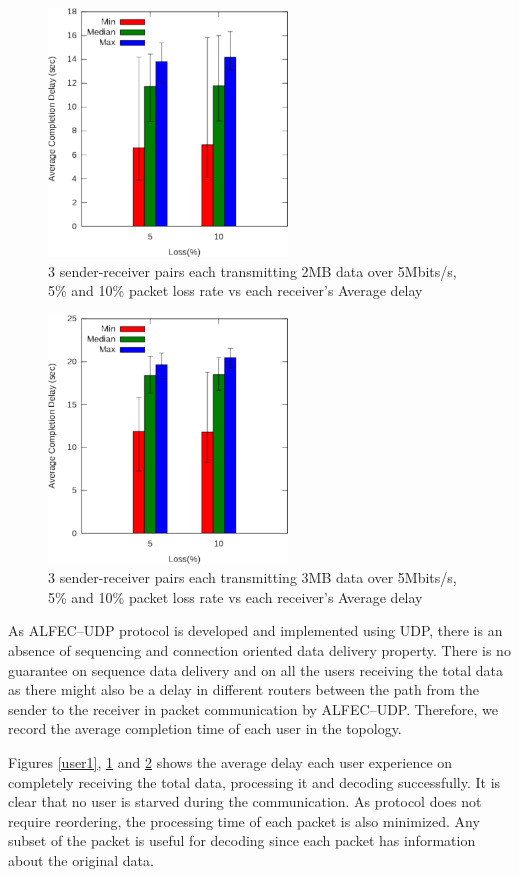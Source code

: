 \begin{figure}[htbp]
\begin{center}
\includegraphics[width=2.5in]{Figures/user2mb}
\caption{3 sender-receiver pairs each transmitting 2MB data over 5Mbits/s, 5\% and 10\% packet loss rate vs each receiver's Average delay}
\label{user2}
\end{center}
\end{figure}

\begin{figure}[htbp]
\begin{center}
\includegraphics[width=2.5in]{Figures/user3mb}
\caption{3 sender-receiver pairs each transmitting 3MB data over 5Mbits/s, 5\% and 10\% packet loss rate vs each receiver's Average delay}
\label{user3}
\end{center}
\end{figure}


As ALFEC--UDP protocol is developed and implemented using UDP, there is an absence of sequencing and connection oriented data delivery property. There is no guarantee on sequence data delivery and on all the users receiving the total data as there might also be a delay in different routers between the path from the sender to the receiver in packet communication by ALFEC--UDP. Therefore, we record the average completion time of each user in the topology. 

Figures \ref{user1}, \ref{user2} and \ref{user3} shows the average delay each user experience on completely receiving the total data, processing it and decoding successfully. It is clear that no user is starved during the communication. As protocol does not require reordering, the processing time of each packet is also minimized. Any subset of the packet is useful for decoding since each packet has information about the original data.
